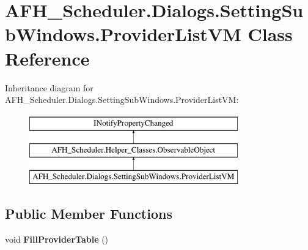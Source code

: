 \section{A\+F\+H\+\_\+\+Scheduler.\+Dialogs.\+Setting\+Sub\+Windows.\+Provider\+List\+VM Class Reference}
\label{class_a_f_h___scheduler_1_1_dialogs_1_1_setting_sub_windows_1_1_provider_list_v_m}
Inheritance diagram for A\+F\+H\+\_\+\+Scheduler.\+Dialogs.\+Setting\+Sub\+Windows.\+Provider\+List\+VM\+:\begin{figure}[H]
\begin{center}
\leavevmode
\includegraphics[height=3.000000cm]{class_a_f_h___scheduler_1_1_dialogs_1_1_setting_sub_windows_1_1_provider_list_v_m}
\end{center}
\end{figure}
\subsection*{Public Member Functions}
\begin{DoxyCompactItemize}
\item 
\mbox{\label{class_a_f_h___scheduler_1_1_dialogs_1_1_setting_sub_windows_1_1_provider_list_v_m_a86f5dbb79895cf813967e3bfa407a768}} 
void {\bfseries Fill\+Provider\+Table} ()
\end{DoxyCompactItemize}
